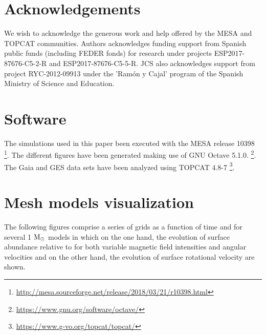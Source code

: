 \documentclass[fleqn,usenatbib]{mnras}
\begin{document}
\section*{Acknowledgements}
We wish to acknowledge the generous work and help offered by the MESA and TOPCAT communities. Authors acknowledges funding support from Spanish public funds (including FEDER fonds) for research under projects ESP2017-87676-C5-2-R and ESP2017-87676-C5-5-R. JCS also acknowledges support from project RYC-2012-09913 under the 'Ram\'on y Cajal' program of the Spanish Ministry of Science and Education.

\section*{Software}
The simulations used in this paper been executed with the MESA release 10398 \footnote{\url{http://mesa.sourceforge.net/release/2018/03/21/r10398.html}}. The different figures have been generated making use of GNU Octave 5.1.0. \footnote{\url{https://www.gnu.org/software/octave/}}. The Gaia and GES data sets have been analyzed using TOPCAT 4.8-7 \footnote{\url{https://www.g-vo.org/topcat/topcat/}}. 











\appendix
\clearpage
\section{Mesh models visualization}
The following figures comprise a series of grids as a function of time and for several 1 $\mathrm{M}_\odot$ models in which on the one hand, the evolution of surface  abundance relative to  for both variable magnetic field intensities and angular velocities and on the other hand, the evolution of surface rotational velocity are shown.
\end{document}

